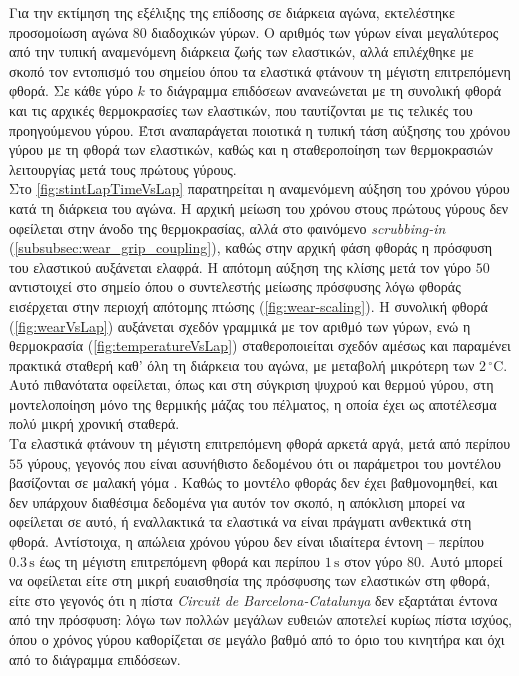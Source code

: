 Για την εκτίμηση της εξέλιξης της επίδοσης σε διάρκεια αγώνα, εκτελέστηκε προσομοίωση αγώνα $80$ διαδοχικών γύρων. Ο αριθμός των γύρων είναι μεγαλύτερος από την τυπική αναμενόμενη διάρκεια ζωής των ελαστικών, αλλά επιλέχθηκε με σκοπό τον εντοπισμό του σημείου όπου τα ελαστικά φτάνουν τη μέγιστη επιτρεπόμενη φθορά. Σε κάθε γύρο $k$ το διάγραμμα επιδόσεων ανανεώνεται με τη συνολική φθορά και τις αρχικές θερμοκρασίες των ελαστικών, που ταυτίζονται με τις τελικές του προηγούμενου γύρου. Έτσι αναπαράγεται ποιοτικά η τυπική τάση αύξησης του χρόνου γύρου με τη φθορά των ελαστικών, καθώς και η σταθεροποίηση των θερμοκρασιών λειτουργίας μετά τους πρώτους γύρους.\\[8pt]

\noindent
Στο \cref{fig:stintLapTimeVsLap} παρατηρείται η αναμενόμενη αύξηση του χρόνου γύρου κατά τη διάρκεια του αγώνα. Η αρχική μείωση του χρόνου στους πρώτους γύρους δεν οφείλεται στην άνοδο της θερμοκρασίας, αλλά στο φαινόμενο \textit{scrubbing-in} (\cref{subsubsec:wear_grip_coupling}), καθώς στην αρχική φάση φθοράς η πρόσφυση του ελαστικού αυξάνεται ελαφρά. Η απότομη αύξηση της κλίσης μετά τον γύρο $50$ αντιστοιχεί στο σημείο όπου ο συντελεστής μείωσης πρόσφυσης λόγω φθοράς εισέρχεται στην περιοχή απότομης πτώσης (\cref{fig:wear-scaling}). Η συνολική φθορά (\cref{fig:wearVsLap}) αυξάνεται σχεδόν γραμμικά με τον αριθμό των γύρων, ενώ η θερμοκρασία (\cref{fig:temperatureVsLap}) σταθεροποιείται σχεδόν αμέσως και παραμένει πρακτικά σταθερή καθ' όλη τη διάρκεια του αγώνα, με μεταβολή μικρότερη των $2\,^\circ\mathrm{C}$. Αυτό πιθανότατα οφείλεται, όπως και στη σύγκριση ψυχρού και θερμού γύρου, στη μοντελοποίηση μόνο της θερμικής μάζας του πέλματος, η οποία έχει ως αποτέλεσμα πολύ μικρή χρονική σταθερά.\\[8pt]
Τα ελαστικά φτάνουν τη μέγιστη επιτρεπόμενη φθορά αρκετά αργά, μετά από περίπου $55$ γύρους, γεγονός που είναι ασυνήθιστο δεδομένου ότι οι παράμετροι του μοντέλου βασίζονται σε μαλακή γόμα \cite{Tremlett2016}. Καθώς το μοντέλο φθοράς δεν έχει βαθμονομηθεί, και δεν υπάρχουν διαθέσιμα δεδομένα για αυτόν τον σκοπό, η απόκλιση μπορεί να οφείλεται σε αυτό, ή εναλλακτικά τα ελαστικά να είναι πράγματι ανθεκτικά στη φθορά. Αντίστοιχα, η απώλεια χρόνου γύρου δεν είναι ιδιαίτερα έντονη -- περίπου $0.3\,\mathrm{s}$ έως τη μέγιστη επιτρεπόμενη φθορά και περίπου $1\,\mathrm{s}$ στον γύρο $80$. Αυτό μπορεί να οφείλεται είτε στη μικρή ευαισθησία της πρόσφυσης των ελαστικών στη φθορά, είτε στο γεγονός ότι η πίστα \textit{Circuit de Barcelona-Catalunya} δεν εξαρτάται έντονα από την πρόσφυση: λόγω των πολλών μεγάλων ευθειών αποτελεί κυρίως πίστα ισχύος, όπου ο χρόνος γύρου καθορίζεται σε μεγάλο βαθμό από το όριο του κινητήρα και όχι από το διάγραμμα επιδόσεων.


